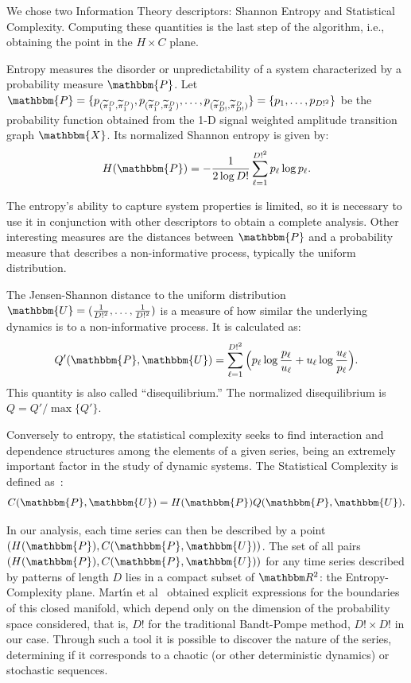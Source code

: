 \documentclass[journal]{IEEEtran}
\begin{document}
We chose two Information Theory descriptors: Shannon Entropy and Statistical Complexity.
Computing these quantities is the last step of the algorithm, i.e., obtaining the point in the $H \times C$ plane.

Entropy measures the disorder or unpredictability of a system characterized by a probability measure $\mathbbm{P}$.
Let $\mathbbm{P} = \{p_{(\widetilde\pi^D_1, \widetilde\pi^D_1)}, p_{(\widetilde\pi^D_1, \widetilde\pi^D_2)}, \dots, p_{(\widetilde\pi^D_{D!}, \widetilde\pi^D_{D!})} \} = \{p_1,\dots,p_{D!^2}\}$ be the probability function obtained from the \mbox{1-D} signal weighted amplitude transition graph $\mathbbm{X}$.
Its normalized Shannon entropy is given by:	
\begin{equation}
H(\mathbbm{P}) = -\frac1{2\log D!}\sum_{\ell=1}^{D!^2} p_{\ell} \log p_{\ell} .
\label{eq:Entropia}
\end{equation}

The entropy's ability to capture system properties is limited, so it is necessary to use it in conjunction with other des\-criptors to obtain a complete analysis.
Other interesting measures are the distances between $\mathbbm{P}$ and a probability measure that describes a non-informative process, typically the uniform distribution.

The Jensen-Shannon distance to the uniform distribution $\mathbbm{U} = (\frac{1}{D!^2}, \dots, \frac{1}{D!^2})$ is a measure of how similar the underlying dynamics is to a non-informative process.
It is calculated as:
\begin{equation}
Q'(\mathbbm{P}, \mathbbm{U}) = \sum_{\ell=1}^{D!^2} \Big(p_\ell \log\frac{p_\ell}{u_\ell} +
u_\ell \log\frac{u_\ell}{p_\ell}
\Big).
\end{equation}
This quantity is also called ``disequilibrium.''
The normalized disequilibrium is $ Q=Q'/\max\{Q'\}$.

Conversely to entropy, the statistical complexity seeks to find interaction and dependence structures among the elements of a given series, being an extremely important factor in the study of dynamic systems.
The Statistical Complexity is defined as~\cite{Lamberti2004Entropic}:
\begin{equation}
C(\mathbbm{P}, \mathbbm{U}) = H(\mathbbm{P}) Q(\mathbbm{P}, \mathbbm{U}).
\end{equation}

In our analysis, each time series can then be described by a point $(H(\mathbbm{P}), C(\mathbbm{P}, \mathbbm{U}))$.
The set of all pairs $(H(\mathbbm{P}), C(\mathbbm{P}, \mathbbm{U}))$ for any time series described by patterns of length $D$ lies in a compact subset of $\mathbbm R^2$: the Entropy-Complexity plane.
Mart\'{\i}n et al~\cite{martin2006generalized} obtained explicit expressions for the boundaries of this closed manifold, which depend only on the dimension of the probability space considered, that is, $D!$ for the traditional Bandt-Pompe method,
$D! \times D!$ in our case.
Through such a tool it is possible to discover the nature of the series, determining if it corresponds to a chaotic (or other deterministic dynamics) or stochastic sequences.
\end{document}
